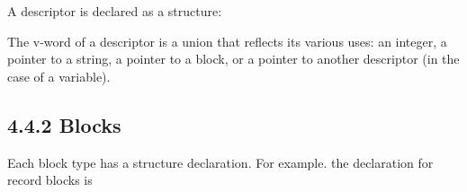 A descriptor is declared as a structure:



The v-word of a descriptor is a union that reflects its various uses:
an integer, a pointer to a string, a pointer to a block, or a pointer
to another descriptor (in the case of a variable).

\subsection[4.4.2 Blocks]{4.4.2 Blocks}

Each block type has a structure declaration. For example. the
declaration for record blocks is

